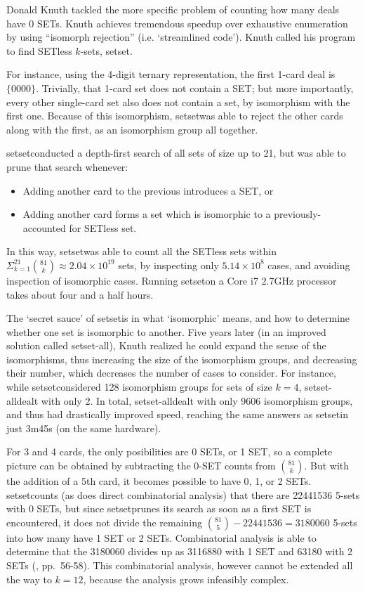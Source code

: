 \documentclass[10pt]{amsart}
\newcommand{\SETSET}{{\sc setset}}
\newcommand{\SETSETA}{{\sc setset-all}}
\begin{document}
Donald Knuth tackled the more specific problem of counting how many deals have 0
SETs. Knuth achieves tremendous speedup over exhaustive enumeration by using
``isomorph rejection'' (i.e. `streamlined code'). Knuth called his program to
find SETless $k$-sets, \SETSET \cite{SETSET}. 

For instance, using the 4-digit ternary representation, the first 1-card deal is
$\{0000\}$. Trivially, that 1-card set does not contain a SET; but more
importantly, every other single-card set also does not contain a set, by
isomorphism with the first one. Because of this isomorphism, \SETSET was able to
reject the other cards along with the first, as an isomorphism group all
together.

\SETSET conducted a depth-first search of all sets of size up to 21, but was
able to prune that search whenever:
\begin{itemize}
\item Adding another card to the previous introduces a SET, or
\item Adding another card forms a set which is isomorphic to a
  previously-accounted for SETless set.
\end{itemize}
In this way, \SETSET was able to count all the SETless sets within
$\Sigma_{k=1}^{21}\binom{81}{k}\approx 2.04\times 10^{19}$ sets, by inspecting
only $5.14\times 10^8$ cases, and avoiding inspection of isomorphic
cases. Running \SETSET on a Core i7 2.7GHz processor takes about four and a half
hours.

The `secret sauce' of \SETSET is in what `isomorphic' means, and how to
determine whether one set is isomorphic to another. Five years later (in an
improved solution called \SETSETA \cite{SETSET-ALL}), Knuth realized he could
expand the sense of the isomorphisms, thus increasing the size of the
isomorphism groups, and decreasing their number, which decreases the number of
cases to consider. For instance, while \SETSET considered 128 isomorphism groups
for sets of size $k=4$, \SETSETA dealt with only 2. In total, \SETSETA dealt
with only 9606 isomorphism groups, and thus had drastically improved speed,
reaching the same answers as \SETSET in just 3m45s (on the same hardware).

For 3 and 4 cards, the only posibilities are 0 SETs, or 1 SET, so a complete
picture can be obtained by subtracting the 0-SET counts from
$\binom{81}{k}$. But with the addition of a 5th card, it becomes possible to
have 0, 1, or 2 SETs. \SETSET counts (as does direct combinatorial analysis)
that there are 22441536 5-sets with 0 SETs, but since \SETSET prunes its search
as soon as a first SET is encountered, it does not divide the remaining
$\binom{81}{5}-22441536=3180060$ 5-sets into how many have 1 SET or 2
SETs. Combinatorial analysis is able to determine that the 3180060 divides up as
3116880 with 1 SET and 63180 with 2 SETs (\cite{JOS}, pp.~56-58). This
combinatorial analysis, however cannot be extended all the way to $k=12$,
because the analysis grows infeasibly complex.
\end{document}

